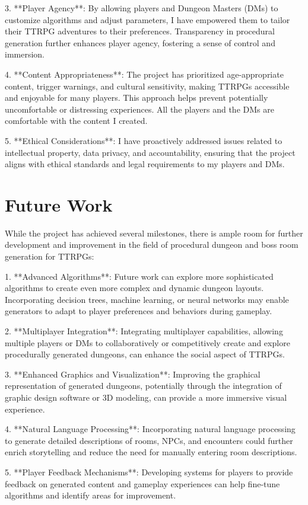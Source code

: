 \documentclass[10pt,twocolumn]{article}
\begin{document}
3. **Player Agency**: By allowing players and Dungeon Masters (DMs) to customize algorithms and adjust parameters,  I have empowered them to tailor their TTRPG adventures to their preferences. Transparency in procedural generation further enhances player agency, fostering a sense of control and immersion.

4. **Content Appropriateness**: The project has prioritized age-appropriate content, trigger warnings, and cultural sensitivity, making TTRPGs accessible and enjoyable for many players. This approach helps prevent potentially uncomfortable or distressing experiences. All the players and the DMs are comfortable with the content I created.

5. **Ethical Considerations**: I have proactively addressed issues related to intellectual property, data privacy, and accountability, ensuring that the project aligns with ethical standards and legal requirements to my players and DMs.
\section{Future Work}
While the project has achieved several milestones, there is ample room for further development and improvement in the field of procedural dungeon and boss room generation for TTRPGs:

1. **Advanced Algorithms**: Future work can explore more sophisticated algorithms to create even more complex and dynamic dungeon layouts. Incorporating decision trees, machine learning, or neural networks may enable generators to adapt to player preferences and behaviors during gameplay.

2. **Multiplayer Integration**: Integrating multiplayer capabilities, allowing multiple players or DMs to collaboratively or competitively create and explore procedurally generated dungeons, can enhance the social aspect of TTRPGs.

3. **Enhanced Graphics and Visualization**: Improving the graphical representation of generated dungeons, potentially through the integration of graphic design software or 3D modeling, can provide a more immersive visual experience.

4. **Natural Language Processing**: Incorporating natural language processing to generate detailed descriptions of rooms, NPCs, and encounters could further enrich storytelling and reduce the need for manually entering room descriptions.

5. **Player Feedback Mechanisms**: Developing systems for players to provide feedback on generated content and gameplay experiences can help fine-tune algorithms and identify areas for improvement.
\end{document}
